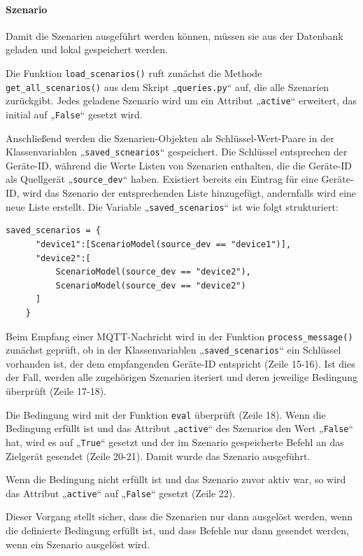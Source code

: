 \documentclass[12pt, letterpaper]{article}
\begin{document}
  \paragraph{Szenario}
  \par \textbf{}
  \par Damit die Szenarien ausgeführt werden können, müssen sie aus der Datenbank geladen und lokal gespeichert werden. 
  \par Die Funktion \texttt{load\_scenarios()} ruft zunächst die Methode \texttt{get\_all\_scenarios()} aus dem Skript „\texttt{queries.py}“ auf, die alle Szenarien zurückgibt. Jedes geladene Szenario wird um ein Attribut „\texttt{active}“ erweitert, das initial auf „\texttt{False}“ gesetzt wird. 
  \par Anschließend werden die Szenarien-Objekten als Schlüssel-Wert-Paare in der Klassenvariablen „\texttt{saved\_scnearios}“ gespeichert. Die Schlüssel entsprechen der Geräte-ID, während die Werte Listen von Szenarien enthalten, die die Geräte-ID als Quellgerät „\texttt{source\_dev}“ haben. Existiert bereits ein Eintrag für eine Geräte-ID, wird das Szenario der entsprechenden Liste hinzugefügt, andernfalls wird eine neue Liste erstellt. Die Variable „\texttt{saved\_scenarios}“ ist wie folgt strukturiert:
  \begin{Verbatim}[frame=single]
    saved_scenarios = {
      "device1":[ScenarioModel(source_dev == "device1")],
      "device2":[
          ScenarioModel(source_dev == "device2"),
          ScenarioModel(source_dev == "device2")
      ]
    }
  \end{Verbatim}
  \par Beim Empfang einer MQTT-Nachricht wird in der Funktion \texttt{process\_message()} zunächst geprüft, ob in der Klassenvariablen „\texttt{saved\_scenarios}“ ein Schlüssel vorhanden ist, der dem empfangenden Geräte-ID entspricht  (Zeile 15-16). Ist dies der Fall, werden alle zugehörigen Szenarien iteriert und deren jeweilige Bedingung überprüft (Zeile 17-18).
  \par Die Bedingung wird mit der Funktion \texttt{eval} überprüft (Zeile 18). Wenn die Bedingung erfüllt ist und das Attribut „\texttt{active}“ des Szenarios den Wert „\texttt{False}“ hat, wird es auf „\texttt{True}“ gesetzt und der im Szenario gespeicherte Befehl an das Zielgerät gesendet (Zeile 20-21). Damit wurde das Szenario ausgeführt.
  \par Wenn die Bedingung nicht erfüllt ist und das Szenario zuvor aktiv war, so wird das Attribut „\texttt{active}“ auf „\texttt{False}“ gesetzt (Zeile 22). 
  \par Dieser Vorgang stellt sicher, dass die Szenarien nur dann ausgelöst werden, wenn die definierte Bedingung erfüllt ist, und dass Befehle nur dann gesendet werden, wenn ein Szenario ausgelöst wird. 
\end{document}
